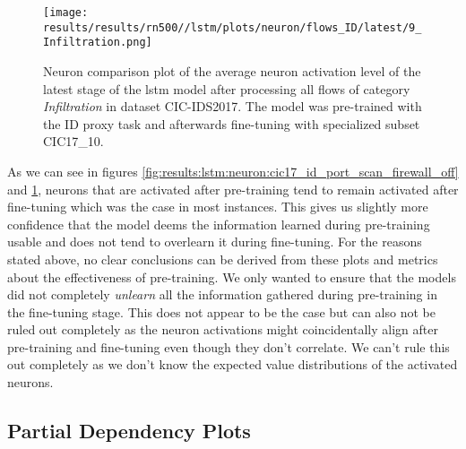 \begin{figure}[h]
	\centering
	\texttt{[image: results/results/rn500//lstm/plots/neuron/flows\_ID/latest/9\_Infiltration.png]}
	\caption{Neuron comparison plot of the average neuron activation level of the latest stage of the \gls{lstm} model after processing all flows of category \textit{Infiltration} in dataset CIC-IDS2017. The model was pre-trained with the ID proxy task and afterwards fine-tuning 
	with specialized subset CIC17\_10.}
	\label{fig:results:lstm:neuron:cic17_id_infiltration}
\end{figure}

As we can see in figures \ref{fig:results:lstm:neuron:cic17_id_port_scan_firewall_off} and \ref{fig:results:lstm:neuron:cic17_id_infiltration}, neurons that are activated after pre-training tend to remain activated after fine-tuning which was the case in most instances. This gives us slightly more confidence that the model deems the information learned during pre-training usable and does not tend to overlearn it during fine-tuning. For the reasons stated above, no clear conclusions can be derived from these plots and metrics about the effectiveness of pre-training. We only wanted to ensure that the models did not completely \textit{unlearn} all the information gathered during pre-training in the fine-tuning stage. This does not appear to be the case but can also not be ruled out completely as the neuron activations might coincidentally align after pre-training and fine-tuning even though they don't correlate. We can't rule this out completely as we don't know the expected value distributions of the activated neurons.

\FloatBarrier

\subsection{Partial Dependency Plots} \label{sec:results:explainability:pdp}

